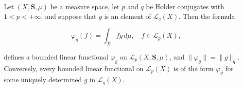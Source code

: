 Let $(X, \mathbf{S}, \mu)$ be a measure space, let $p$ and $q$ be Holder conjugates with $1 < p < +\infty$, and suppose that $g$ is an element of $\mathcal{L}_q(X)$. Then the formula

$$\varphi_g(f) = \int_X f g \, d\mu, \quad f \in \mathcal{L}_p(X),$$

defines a bounded linear functional $\varphi_g$ on $\mathcal{L}_p(X, \mathbf{S}, \mu)$, and $\|\varphi_g\| = \|g\|_q$. Conversely, every bounded linear functional on $\mathcal{L}_p(X)$ is of the form $\varphi_g$ for some uniquely determined $g$ in $\mathcal{L}_q(X)$.

